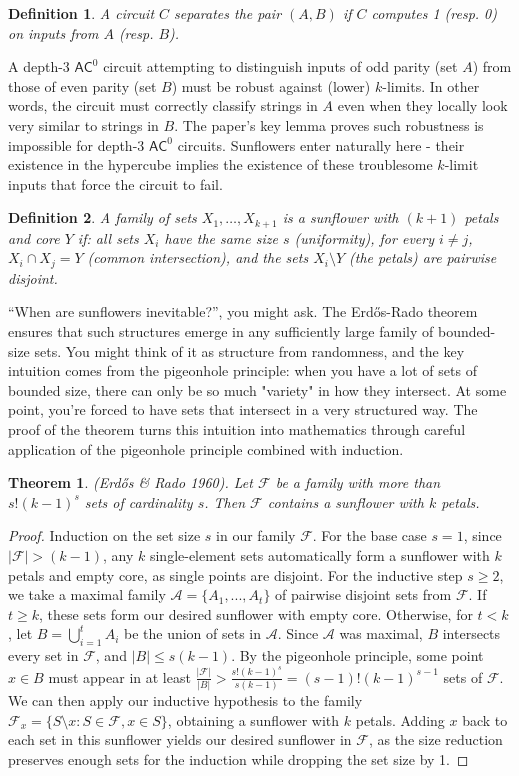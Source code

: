 \documentclass[a4, 12pt]{article}
\newtheorem{definition}{Definition}
\newtheorem{theorem}{Theorem}
\begin{document}
\begin{definition}
A circuit $C$ separates the pair $(A, B)$ if $C$ computes 1 (resp. 0) on inputs from $A$ (resp. $B$). 
\end{definition}
A depth-3 $\mathsf{AC}^0$ circuit attempting to distinguish inputs of odd parity (set $A$) from those of even parity (set $B$) must be robust against (lower) $k$-limits. In other words, the circuit must correctly classify strings in $A$ even when they locally look very similar to strings in $B$. The paper's key lemma proves such robustness is impossible for depth-3 $\mathsf{AC}^0$ circuits. Sunflowers enter naturally here - their existence in the hypercube implies the existence of these troublesome $k$-limit inputs that force the circuit to fail. 
\begin{definition}
A family of sets $X_1, \ldots, X_{k+1}$ is a sunflower with $(k+1)$ petals and core $Y$ if:
all sets $X_i$ have the same size $s$ (uniformity),
for every $i \neq j$, $X_i \cap X_j = Y$ (common intersection), and the sets $X_i \setminus Y$ (the petals) are pairwise disjoint.
\end{definition}
“When are sunflowers inevitable?”, you might ask. The Erdős-Rado theorem ensures that such structures emerge in any sufficiently large family of bounded-size sets. You might think of it as structure from randomness, and the key intuition comes from the pigeonhole principle: when you have a lot of sets of bounded size, there can only be so much "variety" in how they intersect. At some point, you're forced to have sets that intersect in a very structured way. The proof of the theorem turns this intuition into mathematics through careful application of the pigeonhole principle combined with induction.
\begin{theorem}
(Erdős \& Rado 1960). Let $\mathcal{F}$ be a family with more than $s!(k-1)^s$ sets of cardinality $s$. Then $\mathcal{F}$ contains a sunflower with $k$ petals.
\end{theorem}
\begin{proof}
     Induction on the set size $s$ in our family $\mathcal{F}$. For the base case $s=1$, since $|\mathcal{F}| > (k-1)$, any $k$ single-element sets automatically form a sunflower with $k$ petals and empty core, as single points are disjoint. For the inductive step $s \geq 2$, we take a maximal family $\mathcal{A} = \{A_1, ..., A_t\}$ of pairwise disjoint sets from $\mathcal{F}$. If $t \geq k$, these sets form our desired sunflower with empty core. Otherwise, for $t < k$, let $B = \bigcup_{i=1}^t A_i$ be the union of sets in $\mathcal{A}$. Since $\mathcal{A}$ was maximal, $B$ intersects every set in $\mathcal{F}$, and $|B| \leq s(k-1)$. By the pigeonhole principle, some point $x \in B$ must appear in at least $\frac{|\mathcal{F}|}{|B|} > \frac{s!(k-1)^s}{s(k-1)} = (s-1)!(k-1)^{s-1}$ sets of $\mathcal{F}$. We can then apply our inductive hypothesis to the family $\mathcal{F}_x = \{S \setminus {x} : S \in \mathcal{F}, x \in S\}$, obtaining a sunflower with $k$ petals. Adding $x$ back to each set in this sunflower yields our desired sunflower in $\mathcal{F}$, as the size reduction preserves enough sets for the induction while dropping the set size by 1.
\end{proof}
\end{document}
